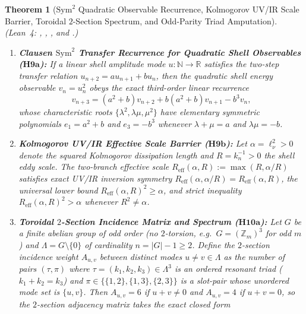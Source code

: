 \documentclass[11pt,a4paper]{article}
\newtheorem{theorem}{Theorem}[section]
\theoremstyle{definition}
\theoremstyle{remark}
\begin{document}
\begin{theorem}[$\mathrm{Sym}^2$ Quadratic Observable Recurrence, Kolmogorov UV/IR Scale Barrier, Toroidal $2$-Section Spectrum, and Odd-Parity Triad Amputation]\label{thm:triads}
\emph{(Lean~4: , , , and .)}
\begin{enumerate}
\item \textbf{Clausen $\mathrm{Sym}^2$ Transfer Recurrence for Quadratic Shell Observables ($\mathbf{H9a}$):} If a linear shell amplitude mode $u : \mathbb{N} \to \mathbb{R}$ satisfies the two-step transfer relation $u_{n+2} = a u_{n+1} + b u_n$, then the quadratic shell energy observable $v_n = u_n^2$ obeys the exact third-order linear recurrence
\begin{equation}\label{eq:sym2_rec}
v_{n+3} = (a^2 + b) v_{n+2} + b(a^2 + b) v_{n+1} - b^3 v_n,
\end{equation}
whose characteristic roots $\{\lambda^2, \lambda\mu, \mu^2\}$ have elementary symmetric polynomials $e_1 = a^2+b$ and $e_3 = -b^3$ whenever $\lambda+\mu=a$ and $\lambda\mu=-b$.
\item \textbf{Kolmogorov UV/IR Effective Scale Barrier ($\mathbf{H9b}$):} Let $\alpha = \ell_\nu^2 > 0$ denote the squared Kolmogorov dissipation length and $R = k_n^{-1} > 0$ the shell eddy scale. The two-branch effective scale $R_{\mathrm{eff}}(\alpha, R) := \max(R, \alpha/R)$ satisfies exact UV/IR inversion symmetry $R_{\mathrm{eff}}(\alpha, \alpha/R) = R_{\mathrm{eff}}(\alpha, R)$, the universal lower bound $R_{\mathrm{eff}}(\alpha, R)^2 \ge \alpha$, and strict inequality $R_{\mathrm{eff}}(\alpha, R)^2 > \alpha$ whenever $R^2 \ne \alpha$.
\item \textbf{Toroidal $2$-Section Incidence Matrix and Spectrum ($\mathbf{H10a}$):} Let $G$ be a finite abelian group of odd order (no $2$-torsion, e.g.\ $G = (\mathbb{Z}_m)^3$ for odd $m$) and $\Lambda = G \setminus \{0\}$ of cardinality $n = |G| - 1 \ge 2$. Define the $2$-section incidence weight $A_{u,v}$ between distinct modes $u \ne v \in \Lambda$ as the number of pairs $(\tau, \pi)$ where $\tau = (k_1, k_2, k_3) \in \Lambda^3$ is an ordered resonant triad ($k_1 + k_2 = k_3$) and $\pi \in \{\{1,2\}, \{1,3\}, \{2,3\}\}$ is a slot-pair whose unordered mode set is $\{u, v\}$. Then $A_{u,v} = 6$ if $u + v \ne 0$ and $A_{u,v} = 4$ if $u + v = 0$, so the $2$-section adjacency matrix takes the exact closed form

\end{enumerate}
\end{theorem}
\end{document}
